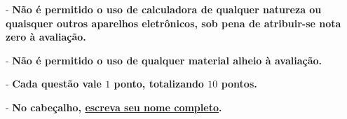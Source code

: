 \documentclass[11pt,a4paper]{article}
\newcommand{\N}{\mathbb{N}}
\begin{document}

\noindent - {\bf Não é permitido o uso de calculadora de qualquer natureza ou quaisquer outros aparelhos eletrônicos, sob pena de atribuir-se nota {\bf zero} à avaliação.}

\noindent - {\bf Não é permitido o uso de qualquer material alheio à avaliação.}

\noindent - {\bf Cada questão vale $1$ ponto, totalizando $10$ pontos.}



\noindent -  {\bf No cabeçalho, \underline{escreva seu nome completo}.}

\end{document}
